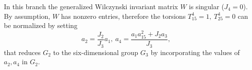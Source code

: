 \documentclass[12pt]{article}
\begin{document}
In this branch the generalized Wilczynski invariant matrix $W$ is singular ($J_4=0$). By assumption, $W$ has nonzero entries, therefore the torsions $T^4_{15}=1,~T^4_{25}=0$ can be normalized by setting 
\begin{equation}
a_2=\frac{J_2}{J_3}a_1,~a_4=\frac{a_1a_{15}^2+J_2a_3}{J_3},
\end{equation}
that reduces $G_2$ to the six-dimensional group $G_3$ by incorporating the values of $a_2, a_4$ in $G_2$.\\
\end{document}
